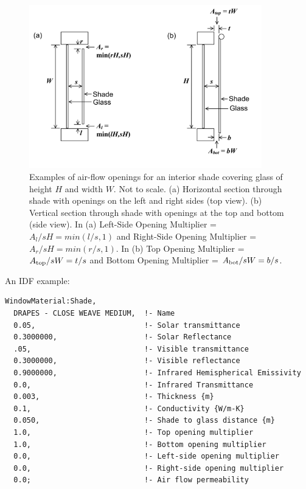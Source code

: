 \begin{figure}[hbtp] %
\centering
\includegraphics[width=0.9\textwidth, height=0.9\textheight, keepaspectratio=true]{media/image034.png}
\caption{Examples of air-flow openings for an interior shade covering glass of height \(H\) and width \(W\). Not to scale. (a) Horizontal section through shade with openings on the left and right sides (top view). (b) Vertical section through shade with openings at the top and bottom (side view). In (a) Left-Side Opening Multiplier = \(A_{l}/sH = min(l/s, 1)\) and Right-Side Opening Multiplier = \(A_{r}/sH = min(r/s, 1)\). In (b) Top Opening Multiplier = \(A_{\rm{top}}/sW = t/s\) and Bottom Opening Multiplier = \(A_{\rm{bot}}/sW = b/s\). \protect \label{fig:examples-of-air-flow-openings-for-an-interior}}
\end{figure}

An IDF example:

\begin{lstlisting}
WindowMaterial:Shade,
  DRAPES - CLOSE WEAVE MEDIUM,  !- Name
  0.05,                         !- Solar transmittance
  0.3000000,                    !- Solar Reflectance
  .05,                          !- Visible transmittance
  0.3000000,                    !- Visible reflectance
  0.9000000,                    !- Infrared Hemispherical Emissivity
  0.0,                          !- Infrared Transmittance
  0.003,                        !- Thickness {m}
  0.1,                          !- Conductivity {W/m-K}
  0.050,                        !- Shade to glass distance {m}
  1.0,                          !- Top opening multiplier
  1.0,                          !- Bottom opening multiplier
  0.0,                          !- Left-side opening multiplier
  0.0,                          !- Right-side opening multiplier
  0.0;                          !- Air flow permeability
\end{lstlisting}


